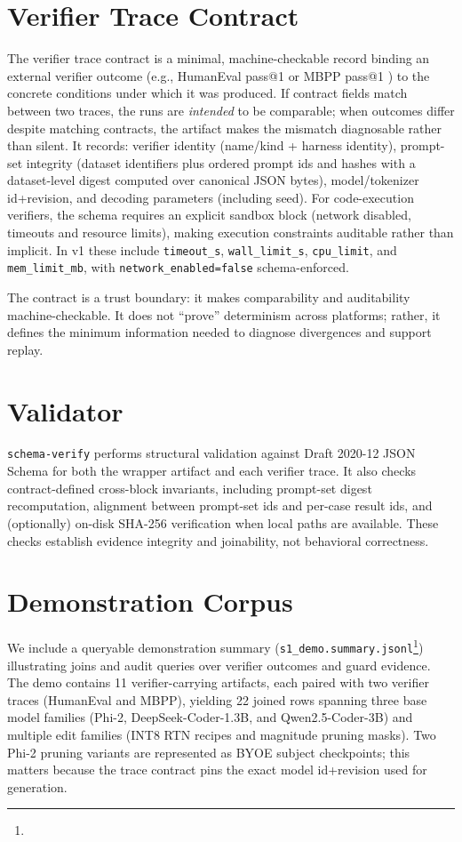 \documentclass{article} %
\newcommand{\schemaverify}{\texttt{schema-verify}\xspace}
\begin{document}
\section{Verifier Trace Contract}
The verifier trace contract is a minimal, machine-checkable record binding an external verifier
outcome (e.g., HumanEval pass@1 \citep{chen2021humaneval} or MBPP pass@1 \citep{austin2021mbpp}) to
the concrete conditions under which it was produced.
If contract fields match between two traces, the runs are \emph{intended} to be comparable; when
outcomes differ despite matching contracts, the artifact makes the mismatch diagnosable rather than
silent.
It records: verifier identity (name/kind + harness identity), prompt-set integrity (dataset
identifiers plus ordered prompt ids and hashes with a dataset-level digest computed over canonical
JSON bytes), model/tokenizer id+revision, and decoding parameters (including seed).
For code-execution verifiers, the schema requires an explicit sandbox block (network disabled,
timeouts and resource limits), making execution constraints auditable rather than implicit. In v1
these include \texttt{timeout\_s}, \texttt{wall\_limit\_s}, \texttt{cpu\_limit}, and
\texttt{mem\_limit\_mb}, with \texttt{network\_enabled=false} schema-enforced.

The contract is a trust boundary: it makes comparability and auditability machine-checkable.
It does not ``prove'' determinism across platforms; rather, it defines the minimum information
needed to diagnose divergences and support replay.

\section{Validator}
\schemaverify performs structural validation against Draft 2020-12 JSON Schema for both the wrapper
artifact and each verifier trace.
It also checks contract-defined cross-block invariants, including prompt-set digest recomputation,
alignment between prompt-set ids and per-case result ids, and (optionally) on-disk SHA-256
verification when local paths are available.
These checks establish evidence integrity and joinability, not behavioral correctness.

\section{Demonstration Corpus}
We include a queryable demonstration summary
(\texttt{s1\_demo.summary.jsonl}\footnote{})
illustrating joins and audit queries over verifier outcomes and guard evidence.
The demo contains 11 verifier-carrying artifacts, each paired with two verifier traces (HumanEval
and MBPP), yielding 22 joined rows spanning three base model families (Phi-2, DeepSeek-Coder-1.3B,
and Qwen2.5-Coder-3B) and multiple edit families (INT8 RTN recipes and magnitude pruning masks).
Two Phi-2 pruning variants are represented as BYOE subject checkpoints; this matters because the
trace contract pins the exact model id+revision used for generation.
\end{document}
